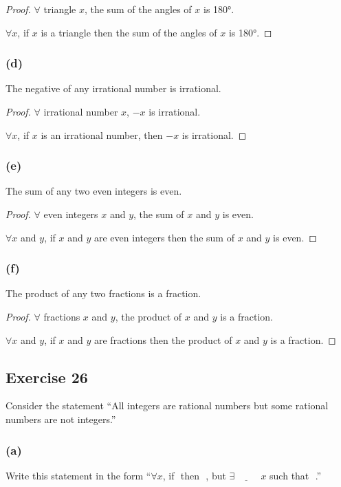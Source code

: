 \documentclass[14pt]{extarticle}
\newcommand{\fbl}{\underline{\hspace{1cm}}\,\,}
\newcommand{\fa}{\forall}
\newcommand{\te}{\exists}
\begin{document}
\begin{proof}
$\fa$ triangle $x$, the sum of the angles of $x$ is 180°. 

$\fa x$, if $x$ is a triangle then the sum of the angles of $x$ is 180°.
\end{proof}

\subsubsection{(d)}
The negative of any irrational number is irrational.

\begin{proof}
$\fa$ irrational number $x$, $-x$ is irrational. 

$\fa x$, if $x$ is an irrational number, then $-x$ is irrational.
\end{proof}

\subsubsection{(e)}
The sum of any two even integers is even.

\begin{proof}
$\fa$ even integers $x$ and $y$, the sum of $x$ and $y$ is even.

$\fa x$ and $y$, if $x$ and $y$ are even integers then the sum of $x$ and $y$ is even.
\end{proof}

\subsubsection{(f)}
The product of any two fractions is a fraction.

\begin{proof}
$\fa$ fractions $x$ and $y$, the product of $x$ and $y$ is a fraction.

$\fa x$ and $y$, if $x$ and $y$ are fractions then the product of $x$ and $y$ is a fraction.
\end{proof}

\subsection{Exercise 26}
Consider the statement “All integers are rational numbers but some rational numbers are not integers.”

\subsubsection{(a)}
Write this statement in the form “$\fa x$, if \fbl then \fbl, but $\te \fbl x$ such that \fbl.”
\end{document}
